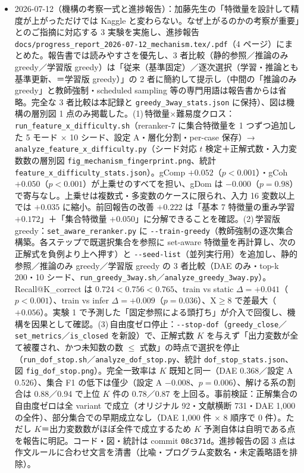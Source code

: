 \documentclass[11pt,a4paper]{jsarticle}
\begin{document}
\begin{itemize}[nosep]
  \item 2026-07-12（機構の考察一式と進捗報告）：加藤先生の「特徴量を設計して精度が上がっただけでは Kaggle と変わらない。なぜ上がるのかの考察が重要」とのご指摘に対応する 3 実験を実施し、進捗報告 \texttt{docs/progress\_report\_2026-07-12\_mechanism.tex/.pdf}（4 ページ）にまとめた。報告書では読みやすさを優先し、3 者比較（静的参照／推論のみ greedy／学習版 greedy）は「従来（基準固定）／逐次選択（学習・推論とも基準更新、＝学習版 greedy）」の 2 者に簡約して提示し（中間の「推論のみ greedy」と教師強制・scheduled sampling 等の専門用語は報告書からは省略。完全な 3 者比較は本記録と \texttt{greedy\_3way\_stats.json} に保持）、図は機構の層別図 1 点のみ掲載した。(1)\,特徴量×難易度クロス：\texttt{run\_feature\_x\_difficulty.sh}（reranker-7 に集合特徴量を 1 つずつ追加した 5 モード × 10 シード、設定 A・層化分割・per-case 保存）→ \texttt{analyze\_feature\_x\_difficulty.py}（シード対応 $t$ 検定＋正解式数・入力変数数の層別図 \texttt{fig\_mechanism\_fingerprint.png}、統計 \texttt{feature\_x\_difficulty\_stats.json}）。gComp $+0.052$（$p<0.001$）・gCoh $+0.050$（$p<0.001$）が上乗せのすべてを担い、gDom は $-0.000$（$p=0.98$）で寄与なし。上乗せは複数式・多変数のケースに限られ、入力 16 変数以上では $+0.035$ に縮小。前回報告の改善 $+0.222$ は「基本 7 特徴量の重み学習 $+0.172$」＋「集合特徴量 $+0.050$」に分解できることを確認。(2)\,学習版 greedy：\texttt{set\_aware\_reranker.py} に \texttt{-{}-train-greedy}（教師強制の逐次集合構築。各ステップで既選択集合を参照に set-aware 特徴量を再計算し、次の正解式を負例より上へ押す）と \texttt{-{}-seed-list}（並列実行用）を追加し、静的参照／推論のみ greedy／学習版 greedy の 3 者比較（DAE のみ・top-k 200・10 シード、\texttt{run\_greedy\_3way.sh}／\texttt{analyze\_greedy\_3way.py}）。Recall@K\_correct は $0.724 < 0.756 < 0.765$、train vs static $\Delta=+0.041$（$p<0.001$）、train vs infer $\Delta=+0.009$（$p=0.036$）、X$\ge$8 で差最大（$+0.056$）。実験 1 で予測した「固定参照による頭打ち」が介入で回復し、機構を因果として確認。(3)\,自由度ゼロ停止：\texttt{-{}-stop-dof}（\texttt{greedy\_close}／\texttt{set\_metrics}／\texttt{is\_closed} を新設）で、正解式数 $K$ を与えず「出力変数が全て被覆され、かつ未知数の数 $\le$ 式数」の時点で選択を停止（\texttt{run\_dof\_stop.sh}／\texttt{analyze\_dof\_stop.py}、統計 \texttt{dof\_stop\_stats.json}、図 \texttt{fig\_dof\_stop.png}）。完全一致率は $K$ 既知と同一（DAE 0.368／設定 A 0.526）、集合 F1 の低下は僅少（設定 A $-0.008$、$p=0.006$）、解ける系の割合は 0.88／0.94 で上位 $K$ 件の 0.78／0.87 を上回る。事前検証：正解集合の自由度ゼロは全 variant で成立（オリジナル 92・文献横断 731・DAE 1{,}000 の全件）、部分集合での早期成立なし（DAE 1{,}000 件 × 8 順序で 0 件）。ただし $K$＝出力変数数がほぼ全件で成立するため $K$ 予測自体は自明である点を報告に明記。コード・図・統計は commit \texttt{08c371d}。進捗報告の図 3 点は作文ルールに合わせ文言を清書（比喩・プログラム変数名・未定義略語を排除）。

\end{itemize}
\end{document}
